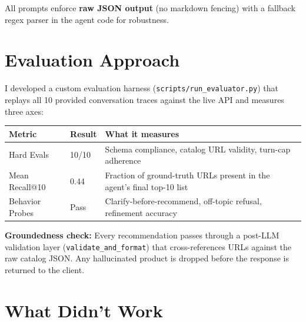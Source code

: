 \documentclass[11pt, a4paper]{article}
\begin{document}
All prompts enforce \textbf{raw JSON output} (no markdown fencing) with a fallback regex parser in the agent code for robustness.

\section{Evaluation Approach}

I developed a custom evaluation harness (\texttt{scripts/\allowbreak run\allowbreak\_evaluator.py}) that replays all 10 provided conversation traces against the live API and measures three axes:

\begin{table}[h]
\centering
\small
\begin{tabularx}{\textwidth}{l l X}
\toprule
\textbf{Metric} & \textbf{Result} & \textbf{What it measures} \\
\midrule
Hard Evals & 10/10 & Schema compliance, catalog URL validity, turn-cap adherence \\
Mean Recall@10 & 0.44 & Fraction of ground-truth URLs present in the agent's final top-10 list \\
Behavior Probes & Pass & Clarify-before-recommend, off-topic refusal, refinement accuracy \\
\bottomrule
\end{tabularx}
\end{table}

\textbf{Groundedness check:} Every recommendation passes through a post-LLM validation layer (\texttt{validate\allowbreak\_and\allowbreak\_format}) that cross-references URLs against the raw catalog JSON. Any hallucinated product is dropped before the response is returned to the client.

\section{What Didn't Work}
\end{document}
